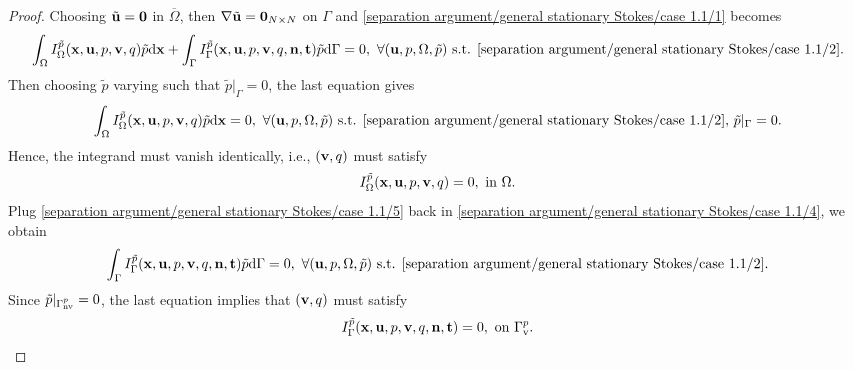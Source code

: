 \documentclass[oneside,11pt]{book}
\numberwithin{equation}{section}
\begin{document}
\begin{enumerate}[leftmargin=0mm]
\begin{itemize}[leftmargin=0in]
        \begin{proof}
            Choosing $\tilde{\bf u} = {\bf 0}$ in $\overline{\Omega}$, then $\nabla\tilde{\bf u} = {\bf 0}_{N\times N}$ on $\Gamma$ and \eqref{separation argument/general stationary Stokes/case 1.1/1} becomes
            \begin{align}
                \label{separation argument/general stationary Stokes/case 1.1/4}
                \int_\Omega I_\Omega^{\tilde{p}}({\bf x},{\bf u},p,{\bf v},q)\tilde{p}{\rm d}{\bf x} + \int_\Gamma I_\Gamma^{\tilde{p}}({\bf x},{\bf u},p,{\bf v},q,{\bf n},{\bf t})\tilde{p}{\rm d}\Gamma = 0,\ \forall({\bf u},p,\Omega,\tilde{p})\mbox{ s.t. \eqref{separation argument/general stationary Stokes/case 1.1/2}}.
            \end{align}
            Then choosing $\tilde{p}$ varying such that $\tilde{p}|_\Gamma = 0$, the last equation gives
            \begin{align*}
                \int_\Omega I_\Omega^{\tilde{p}}({\bf x},{\bf u},p,{\bf v},q)\tilde{p}{\rm d}{\bf x} = 0,\ \forall({\bf u},p,\Omega,\tilde{p})\mbox{ s.t. \eqref{separation argument/general stationary Stokes/case 1.1/2}},\,\tilde{p}|_\Gamma = 0.
            \end{align*}
            Hence, the integrand must vanish identically, i.e., $({\bf v},q)$ must satisfy
            \begin{align}
                \label{separation argument/general stationary Stokes/case 1.1/5}
                I_\Omega^{\tilde{p}}({\bf x},{\bf u},p,{\bf v},q) = 0,\mbox{ in }\Omega.
            \end{align}
            Plug \eqref{separation argument/general stationary Stokes/case 1.1/5} back in \eqref{separation argument/general stationary Stokes/case 1.1/4}, we obtain
            \begin{align*}
                \int_\Gamma I_\Gamma^{\tilde{p}}({\bf x},{\bf u},p,{\bf v},q,{\bf n},{\bf t})\tilde{p}{\rm d}\Gamma = 0,\ \forall({\bf u},p,\Omega,\tilde{p})\mbox{ s.t. \eqref{separation argument/general stationary Stokes/case 1.1/2}}.
            \end{align*}
            Since $\tilde{p}|_{\Gamma_{\rm nv}^p} = 0$, the last equation implies that $({\bf v},q)$ must satisfy
            \begin{align}
                \label{separation argument/general stationary Stokes/case 1.1/6}
                I_\Gamma^{\tilde{p}}({\bf x},{\bf u},p,{\bf v},q,{\bf n},{\bf t}) = 0,\mbox{ on }\Gamma_{\rm v}^p.
            \end{align}

\end{proof}
\end{itemize}
\end{enumerate}
\end{document}
